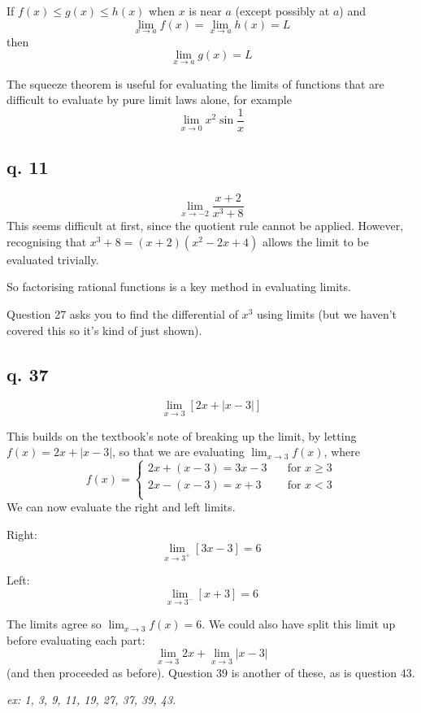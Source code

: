 \documentclass[10pt,a4paper]{report}
\begin{document}
If $f(x) \leq g(x) \leq h(x)$ when $x$ is near $a$ (except possibly at $a$) and
$$
	\lim_{x \to a} f(x) = \lim_{x \to a} h(x) = L
$$
then
$$
	\lim_{x \to a} g(x) = L
$$

The squeeze theorem is useful for evaluating the limits of functions that are difficult to evaluate by pure limit laws alone, for example
$$\lim_{x \to 0} x^2 \sin \frac{1}{x} $$



\subsection{q. 11}

$$
	\lim_{x \to -2} \frac{x + 2}{x^3 + 8}
$$
This seems difficult at first, since the quotient rule cannot be applied.
However, recognising that $x^3 + 8 = (x+2)(x^2 - 2x + 4)$ allows the limit to be evaluated trivially.

So factorising rational functions is a key method in evaluating limits.

Question 27 asks you to find the differential of $x^3$ using limits (but we haven't covered this so it's kind of just shown).

\subsection{q. 37}

$$
	\lim_{x \to 3} [2x + |x - 3|]
$$

This builds on the textbook's note of breaking up the limit, by letting $f(x) = 2x + |x - 3|$, so that we are evaluating $\lim_{x \to 3} f(x)$, where
$$
	f(x) = 
	\begin{cases}
		2x + (x - 3) = 3x - 3 & \quad \text{for } x \geq 3 \\
		2x - (x - 3) = x + 3 & \quad \text{for } x < 3 \\
	\end{cases}
$$
We can now evaluate the right and left limits.

Right:
$$
	\lim_{x \to 3^+} [3x - 3] = 6
$$

Left:
$$
	\lim_{x \to 3^-} [x + 3] = 6
$$

The limits agree so $\lim_{x \to 3} f(x) = 6$. We could also have split this limit up before evaluating each part:
$$
	\lim_{x \to 3} 2x + \lim_{x \to 3} |x - 3|
$$
(and then proceeded as before). Question 39 is another of these, as is question 43.


\emph{ex: 1, 3, 9, 11, 19, 27, 37, 39, 43.}
\end{document}
